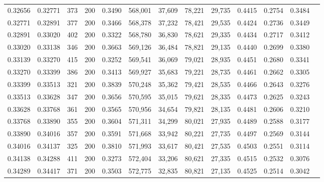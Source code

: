 \begin{tabular}{rrrrrrrrrrrrr}
0.32656 & 0.32771 &    373 & 200 &                                     0.3490 & 568,001 &  37,609 &  78,221 &  29,735 & 0.4415 & 0.2754 & 0.3484 \\
0.32771 & 0.32891 &    377 & 200 &                                     0.3466 & 568,378 &  37,232 &  78,421 &  29,535 & 0.4424 & 0.2736 & 0.3449 \\
0.32891 & 0.33020 &    402 & 200 &                                     0.3322 & 568,780 &  36,830 &  78,621 &  29,335 & 0.4434 & 0.2717 & 0.3412 \\
0.33020 & 0.33138 &    346 & 200 &                                     0.3663 & 569,126 &  36,484 &  78,821 &  29,135 & 0.4440 & 0.2699 & 0.3380 \\
0.33139 & 0.33270 &    415 & 200 &                                     0.3252 & 569,541 &  36,069 &  79,021 &  28,935 & 0.4451 & 0.2680 & 0.3341 \\
0.33270 & 0.33399 &    386 & 200 &                                     0.3413 & 569,927 &  35,683 &  79,221 &  28,735 & 0.4461 & 0.2662 & 0.3305 \\
0.33399 & 0.33513 &    321 & 200 &                                     0.3839 & 570,248 &  35,362 &  79,421 &  28,535 & 0.4466 & 0.2643 & 0.3276 \\
0.33513 & 0.33628 &    347 & 200 &                                     0.3656 & 570,595 &  35,015 &  79,621 &  28,335 & 0.4473 & 0.2625 & 0.3243 \\
0.33628 & 0.33768 &    361 & 200 &                                     0.3565 & 570,956 &  34,654 &  79,821 &  28,135 & 0.4481 & 0.2606 & 0.3210 \\
0.33768 & 0.33890 &    355 & 200 &                                     0.3604 & 571,311 &  34,299 &  80,021 &  27,935 & 0.4489 & 0.2588 & 0.3177 \\
0.33890 & 0.34016 &    357 & 200 &                                     0.3591 & 571,668 &  33,942 &  80,221 &  27,735 & 0.4497 & 0.2569 & 0.3144 \\
0.34016 & 0.34137 &    325 & 200 &                                     0.3810 & 571,993 &  33,617 &  80,421 &  27,535 & 0.4503 & 0.2551 & 0.3114 \\
0.34138 & 0.34288 &    411 & 200 &                                     0.3273 & 572,404 &  33,206 &  80,621 &  27,335 & 0.4515 & 0.2532 & 0.3076 \\
0.34289 & 0.34417 &    371 & 200 &                                     0.3503 & 572,775 &  32,835 &  80,821 &  27,135 & 0.4525 & 0.2514 & 0.3042 \\

\end{tabular}
